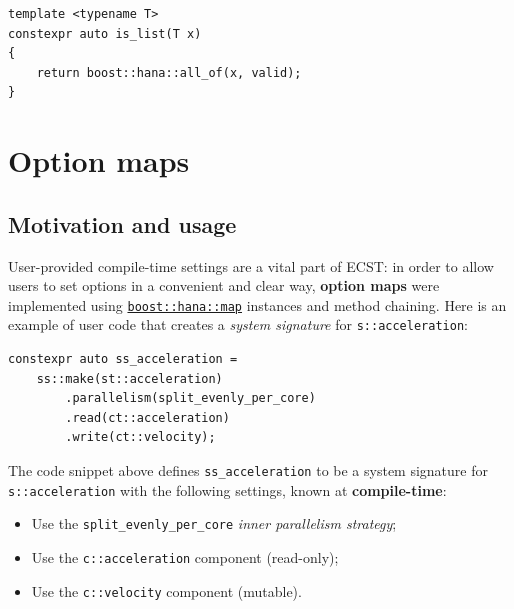 \documentclass[twoside, 12pt, a4paper, openright]{book}
\begin{document}
\begin{verbatim}
template <typename T>
constexpr auto is_list(T x)
{
    return boost::hana::all_of(x, valid);
}
\end{verbatim}

\hypertarget{metaprogramming_option_maps}{\section{Option
maps}\label{metaprogramming_option_maps}}

\subsection{Motivation and usage}\label{motivation-and-usage-1}

User-provided compile-time settings are a vital part of ECST: in order
to allow users to set options in a convenient and clear way,
\textbf{option maps} were implemented using
\href{http://www.boost.org/doc/libs/1_61_0/libs/hana/doc/html/structboost_1_1hana_1_1map.html}{\texttt{boost::hana::map}}
instances and method chaining. Here is an example of user code that
creates a \emph{system signature} for
\texttt{s::acceleration}:

\begin{verbatim}
constexpr auto ss_acceleration =
    ss::make(st::acceleration)
        .parallelism(split_evenly_per_core)
        .read(ct::acceleration)
        .write(ct::velocity);
\end{verbatim}

The code snippet above defines
\texttt{ss_acceleration}
to be a system signature for
\texttt{s::acceleration}
with the following settings, known at \textbf{compile-time}:

\begin{itemize}
\item
  Use the
  \texttt{split_evenly_per_core}
  \emph{inner parallelism strategy};
\item
  Use the
  \texttt{c::acceleration}
  component (read-only);
\item
  Use the
  \texttt{c::velocity}
  component (mutable).
\end{itemize}
\end{document}
